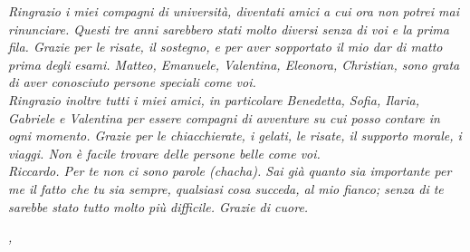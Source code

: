 \noindent \textit{Ringrazio i miei compagni di università, diventati amici a cui ora non potrei mai rinunciare. Questi tre anni sarebbero stati molto diversi senza di voi e la prima fila. Grazie per le risate, il sostegno, e per aver sopportato il mio dar di matto prima degli esami. Matteo, Emanuele, Valentina, Eleonora, Christian, sono grata di aver conosciuto persone speciali come voi.}\\

\noindent \textit{Ringrazio inoltre tutti i miei amici, in particolare Benedetta, Sofia, Ilaria, Gabriele e Valentina per essere compagni di avventure su cui posso contare in ogni momento. Grazie per le chiacchierate, i gelati, le risate, il supporto morale, i viaggi. Non è facile trovare delle persone belle come voi.}\\

\noindent \textit{Riccardo. Per te non ci sono parole (chacha). Sai già quanto sia importante per me il fatto che tu sia sempre, qualsiasi cosa succeda, al mio fianco; senza di te sarebbe stato tutto molto più difficile. Grazie di cuore.}\\
\bigskip

\noindent\textit{\myLocation, \myTime}
\hfill \myName
\endgroup

